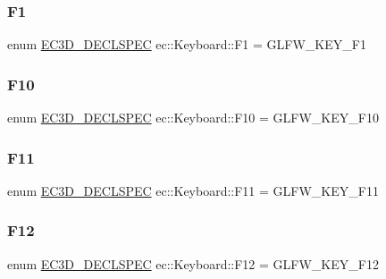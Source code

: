 \mbox{\label{classec_1_1_keyboard_aa5d09923e2ac2f5dd3b2a5b33a06b721}} 
\subsubsection{\texorpdfstring{F1}{F1}}
{\footnotesize\ttfamily enum \mbox{\hyperlink{_common_8h_aac42573e202ca3dd4d259c81691e2369}{E\+C3\+D\+\_\+\+D\+E\+C\+L\+S\+P\+EC}} ec\+::\+Keyboard\+::\+F1 = G\+L\+F\+W\+\_\+\+K\+E\+Y\+\_\+\+F1}

\mbox{\label{classec_1_1_keyboard_aa168a7e6cc3afa55dd5688e977fc6bfe}} 
\subsubsection{\texorpdfstring{F10}{F10}}
{\footnotesize\ttfamily enum \mbox{\hyperlink{_common_8h_aac42573e202ca3dd4d259c81691e2369}{E\+C3\+D\+\_\+\+D\+E\+C\+L\+S\+P\+EC}} ec\+::\+Keyboard\+::\+F10 = G\+L\+F\+W\+\_\+\+K\+E\+Y\+\_\+\+F10}

\mbox{\label{classec_1_1_keyboard_a52c268ea148aa4b22142873360c91fc2}} 
\subsubsection{\texorpdfstring{F11}{F11}}
{\footnotesize\ttfamily enum \mbox{\hyperlink{_common_8h_aac42573e202ca3dd4d259c81691e2369}{E\+C3\+D\+\_\+\+D\+E\+C\+L\+S\+P\+EC}} ec\+::\+Keyboard\+::\+F11 = G\+L\+F\+W\+\_\+\+K\+E\+Y\+\_\+\+F11}

\mbox{\label{classec_1_1_keyboard_a699bc14d848736ef074a47db2f568109}} 
\subsubsection{\texorpdfstring{F12}{F12}}
{\footnotesize\ttfamily enum \mbox{\hyperlink{_common_8h_aac42573e202ca3dd4d259c81691e2369}{E\+C3\+D\+\_\+\+D\+E\+C\+L\+S\+P\+EC}} ec\+::\+Keyboard\+::\+F12 = G\+L\+F\+W\+\_\+\+K\+E\+Y\+\_\+\+F12}

